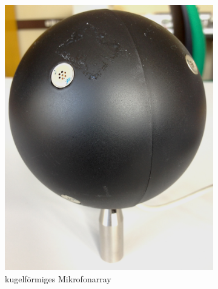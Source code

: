 \begin{figure}
        \centering
        \begin{subfigure}[b]{0.435\textwidth}
                \centering
                \includegraphics[width=\textwidth]{images/01_Einfuehrung/Foto_MikrofonArray}
                \caption{kugelförmiges Mikrofonarray}
                \label{fig:Foto_MikrofonArray}
        \end{subfigure}
        ~ %
        \begin{subfigure}[b]{0.48\textwidth}
                \centering

\end{subfigure}
\end{figure}
